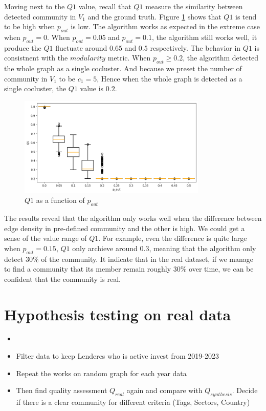 Moving next to the $Q1$ value, recall that $Q1$ measure the similarity between detected community in $V_1$ and the ground truth.
Figure \ref{fig:Q1_pout} shows that $Q1$ is tend to be high when $p_{out}$ is low.
The algorithm works as expected in the extreme case when $p_{out} = 0$.
When $p_{out} = 0.05$ and $p_{out} = 0.1$, the algorithm still works well, it produce the $Q1$ fluctuate around $0.65$ and $0.5$ respectively.
The behavior in $Q1$ is consistnent with the $modularity$ metric.
When $p_{out} \ge 0.2$, the algorithm detected the whole graph as a single cocluster.
And because we preset the number of community in $V_1$ to be $c_1=5$,
Hence when the whole graph is detected as a single cocluster, the $Q1$ value is $0.2$.

\begin{figure}[H]
	\centering
	\includegraphics[width=0.8\textwidth]{images/Q1_pout.png}
	\caption{$Q1$ as a function of $p_{out}$ }
	\label{fig:Q1_pout}
\end{figure}

The results reveal that the algorithm only works well when the difference between edge density in pre-defined community and the other is high.
We could get a sense of the value range of $Q1$.
For example, even the difference is quite large when $p_{out}=0.15$,
$Q1$ only archieve around $0.3$, meaning that the algorithm only detect $30\%$ of the community.
It indicate that in the real dataset, if we manage to find a community that
its member remain roughly $30\%$ over time, we can be confident that the community is real.



\section{Hypothesis testing on real data}

\begin{itemize}
	\item
	\item Filter data to keep Lenderes who is active invest from 2019-2023
	\item Repeat the works on random graph for each year data
	\item Then find quality assessment $Q_{real}$ again and compare with $Q_{synthesis}$.
	      Decide if there is a clear community for different criteria (Tags, Sectors, Country)
\end{itemize}

